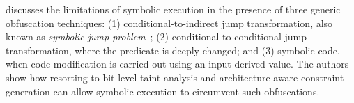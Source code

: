 \cite{YD-CCS15} discusses the limitations of symbolic execution in the presence of three generic obfuscation techniques: (1) conditional-to-indirect jump transformation, also known as {\em symbolic jump problem}~\cite{SAB-SP10}; (2) conditional-to-conditional jump transformation, where the predicate is deeply changed; and (3) symbolic code, when code modification is carried out using an input-derived value. The authors show how resorting to bit-level taint analysis and architecture-aware constraint generation can allow symbolic execution to circumvent such obfuscations.